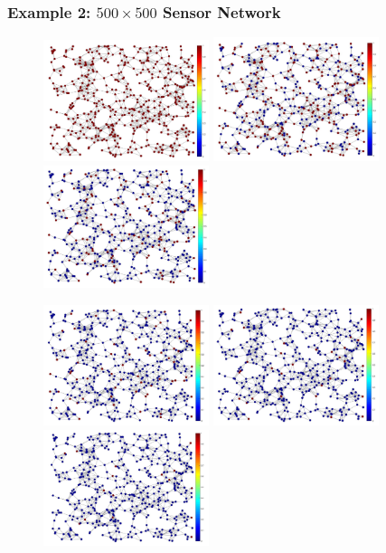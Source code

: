 \documentclass[a4paper]{article}
\begin{document}
\subsubsection{Example 2: $500\times 500$ Sensor Network}

\begin{figure}[h]
\centering
\includegraphics[width=4.84cm,keepaspectratio]{sensor_network/graph} \includegraphics[width=4.85cm,keepaspectratio]{sensor_network/downsample_stage_1} \includegraphics[width=4.85cm,keepaspectratio]{sensor_network/downsample_stage_2}

\includegraphics[width=4.84cm,keepaspectratio]{sensor_network/downsample_stage_3} \includegraphics[width=4.85cm,keepaspectratio]{sensor_network/downsample_stage_4} \includegraphics[width=4.85cm,keepaspectratio]{sensor_network/downsample_stage_5}


\end{figure}
\end{document}
